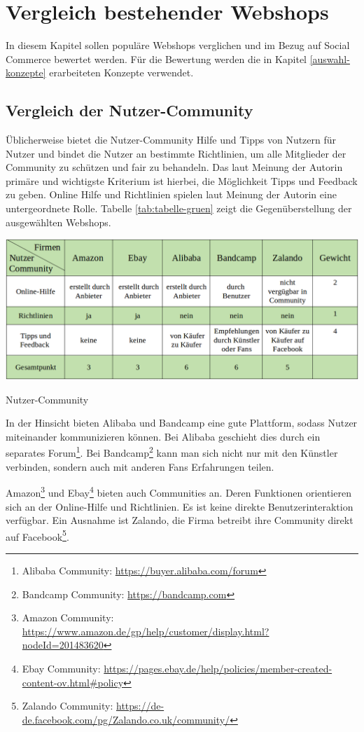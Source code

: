 
\chapter{Vergleich bestehender Webshops}

In diesem Kapitel sollen populäre Webshops verglichen und im Bezug auf Social Commerce bewertet werden. Für die Bewertung werden die in Kapitel \ref{auswahl-konzepte} erarbeiteten Konzepte verwendet.


\section{Vergleich der Nutzer-Community}

Üblicherweise bietet die Nutzer-Community Hilfe und Tipps von Nutzern für Nutzer und bindet die Nutzer an bestimmte Richtlinien, um alle Mitglieder der Community zu schützen und fair zu behandeln. Das laut Meinung der Autorin primäre und wichtigste Kriterium ist hierbei, die Möglichkeit Tipps und Feedback zu geben. Online Hilfe und Richtlinien spielen laut Meinung der Autorin eine untergeordnete Rolle. Tabelle \vref{tab:tabelle-gruen} zeigt die Gegenüberstellung der ausgewählten Webshops.

\begin{table}[htbp]
	\centering
	\includegraphics[width=1\textwidth]{bilder/tabelle-gruen.png}
	\caption{Nutzer-Community}
	\label{tab:tabelle-gruen}
\end{table}

In der Hinsicht bieten Alibaba und Bandcamp eine gute Plattform, sodass Nutzer miteinander kommunizieren können. Bei Alibaba geschieht dies durch ein separates Forum\footnote{Alibaba Community: \url{https://buyer.alibaba.com/forum}}. Bei Bandcamp\footnote{ Bandcamp Community: \url{https://bandcamp.com}} kann man sich nicht nur mit den Künstler verbinden, sondern auch mit anderen Fans Erfahrungen teilen.

Amazon\footnote{Amazon Community: \url{https://www.amazon.de/gp/help/customer/display.html?nodeId=201483620}} und Ebay\footnote{Ebay Community: \url{https://pages.ebay.de/help/policies/member-created-content-ov.html\#policy}} bieten auch Communities an. Deren Funktionen orientieren sich an der Online-Hilfe und Richtlinien. Es ist keine direkte Benutzerinteraktion verfügbar. Ein Ausnahme ist Zalando, die Firma betreibt ihre Community direkt auf Facebook\footnote{Zalando Community: \url{https://de-de.facebook.com/pg/Zalando.co.uk/community/}}.

